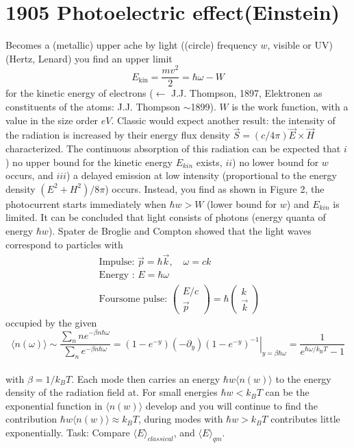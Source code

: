 \section{1905 Photoelectric effect(Einstein)}
Becomes a (metallic) upper ache by light ((circle) frequency $w$, visible or UV) (Hertz, Lenard) you find an upper limit
\begin{equation}
E_{\mathrm{kin}}=\frac{m v^{2}}{2}=\hbar \omega-W
\end{equation}
for the kinetic energy of electrons ($\gets$ J.J. Thompson, 1897, Elektronen as constituents of the atoms: J.J. Thompson $\sim$1899). $W$ is the work function, with a value in the size order $eV$. Classic would expect another result: the intensity of the radiation is increased by their energy flux density $\vec{S} = (c/4\pi)\vec{E}\times \vec{H}$ characterized. The continuous absorption of this radiation can be expected that $i$) no upper bound
for the kinetic energy $E_{kin}$ exists, $ii$) no lower bound for $w$ occurs, and $ iii$) a delayed emission at low intensity (proportional
to the energy density $(E^2 + H^2) /8\pi$) occurs. Instead, you find as shown in Figure 2, the photocurrent starts immediately when $\hbar w > W$
(lower bound for $w$) and $E_{kin}$ is limited. It can be concluded that light consists of photons (energy quanta of energy $\hbar w$). Spater de Broglie and Compton showed that the light waves correspond to particles with\\
\begin{equation}
\begin{array}{l}{\mbox { Impulse: } \vec{p}=\hbar \vec{k}, \quad \omega=c k} \\ {\mbox  { Energy : } E=\hbar \omega} \\ {\mbox  { Foursome pulse: }\left(\begin{array}{c}{E / c} \\ {\vec{p}}\end{array}\right)=\hbar\left(\begin{array}{c}{k} \\ {\vec{k}}\end{array}\right)}\end{array}
\end{equation}
occupied by the given
\\
\begin{equation}
    \langle n(\omega)\rangle \sim \frac{\sum_{n} n e^{-\beta n \hbar \omega}}{\sum_{n} e^{-\beta n \hbar \omega}}=\left.\left(1-e^{-y}\right)\left(-\partial_{y}\right)\left(1-e^{-y}\right)^{-1}\right|_{y=\beta \hbar \omega}=\frac{1}{e^{\hbar \omega / k_{\mathrm{B}} T}-1}
\end{equation}\\
with $\beta = 1/k_BT$. Each mode then carries an energy $\hbar w\langle n(w)\rangle$ to the energy density of the
radiation field at. For small energies $\hbar w <k_BT$ can be the exponential function in $\langle n(w)\rangle$ develop and you will continue to find the contribution $\hbar w\langle n(w)\rangle \approx k_BT$, during modes with $\hbar w > k_BT$ contributes little exponentially. Task: Compare $\langle E\rangle_{classical}$, and $\langle E\rangle_{qm}$.


